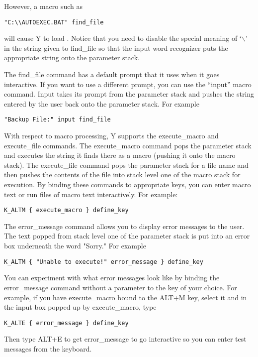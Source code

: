 However, a macro such as

\begin{verbatim}
"C:\\AUTOEXEC.BAT" find_file
\end{verbatim}

will cause Y to load . Notice that you need to disable the
special meaning of `$\backslash$' in the string given to find\_file so that the input word
recognizer puts the appropriate string onto the parameter stack.

The find\_file command has a default prompt that it uses when it goes interactive. If you want
to use a different prompt, you can use the ``input'' macro command. Input takes its prompt from
the parameter stack and pushes the string entered by the user back onto the parameter stack. For
example

\begin{verbatim}
"Backup File:" input find_file
\end{verbatim}

With respect to macro processing, Y supports the execute\_macro and execute\_file commands. The
execute\_macro command pops the parameter stack and executes the string it finds there as a
macro (pushing it onto the macro stack). The execute\_file command pops the parameter stack for
a file name and then pushes the contents of the file into stack level one of the macro stack for
execution. By binding these commands to appropriate keys, you can enter macro text or run files
of macro text interactively. For example:

\begin{verbatim}
K_ALTM { execute_macro } define_key
\end{verbatim}

The error\_message command allows you to display error messages to the user. The text popped
from stack level one of the parameter stack is put into an error box underneath the word
"Sorry." For example

\begin{verbatim}
K_ALTM { "Unable to execute!" error_message } define_key
\end{verbatim}

You can experiment with what error messages look like by binding the error\_message command
without a parameter to the key of your choice. For example, if you have execute\_macro bound to
the ALT+M key, select it and in the input box popped up by execute\_macro, type

\begin{verbatim}
K_ALTE { error_message } define_key
\end{verbatim}

Then type ALT+E to get error\_message to go interactive so you can enter test messages from the
keyboard.
